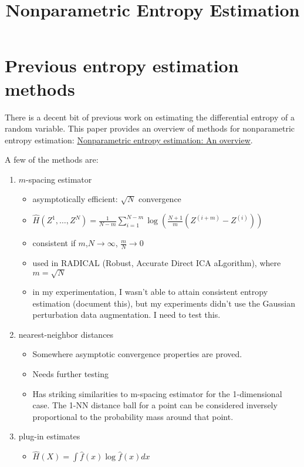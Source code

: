 \documentclass{article}
\title{Nonparametric Entropy Estimation}
\begin{document}
  \maketitle

  \section{Previous entropy estimation methods}


  There is a decent bit of previous work on estimating the differential entropy of a random variable. This paper provides an overview of methods for nonparametric entropy estimation: \href{http://ecf.caltech.edu/summerlecture/docs/Entropy\%20estimation.pdf}{Nonparametric entropy estimation: An overview}.


  A few of the methods are:
  \begin{enumerate}
  \item $m$-spacing estimator
    \begin{itemize}
    \item asymptotically efficient: $\sqrt{N}$ convergence
    \item $ \hat{H}(Z^1,\ldots,Z^N) =  \frac{1}{N-m} \sum_{i=1}^{N-m} \log \left( \frac{N+1}{m}(Z^{(i+m)} - Z^{(i)}) \right) $
    \item consistent if $m$,$N \rightarrow \infty$, $\frac{m}{N} \rightarrow 0$
    \item used in RADICAL (Robust, Accurate Direct ICA aLgorithm), where $m = \sqrt{N} $
    \item in my experimentation, I wasn't able to attain consistent entropy estimation (document this), but my experiments didn't use the Gaussian perturbation data augmentation. I need to test this.
    \end{itemize}
  \item nearest-neighbor distances
    \begin{itemize}
    \item Somewhere asymptotic convergence properties are proved.
    \item Needs further testing
    \item Has striking similarities to m-spacing estimator for the 1-dimensional case. The 1-NN distance ball for a point can be considered inversely proportional to the probability mass around that point.
    \end{itemize}
  \item plug-in estimates
    \begin{itemize}
    \item $ \hat{H}(X) = \int \hat{f}(x) \log \hat{f}(x) dx $

\end{itemize}
\end{enumerate}
\end{document}
